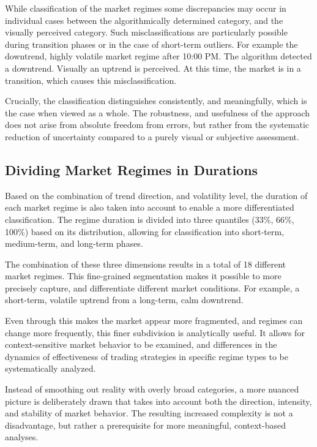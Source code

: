 While classification of the market regimes some discrepancies may occur in individual cases between the algorithmically determined category, and the visually perceived category. Such misclassifications are particularly possible during transition phases or in the case of short-term outliers. For example the downtrend, highly volatile market regime after 10:00 PM. The algorithm detected a downtrend. Visually an uptrend is perceived. At this time, the market is in a transition, which causes this misclassification.

Crucially, the classification distinguishes consistently, and meaningfully, which is the case when viewed as a whole. The robustness, and usefulness of the approach does not arise from absolute freedom from errors, but rather from the systematic reduction of uncertainty compared to a purely visual or subjective assessment.

\subsection{Dividing Market Regimes in Durations}

Based on the combination of trend direction, and volatility level, the duration of each market regime is also taken into account to enable a more differentiated classification. The regime duration is divided into three quantiles (33\%, 66\%, 100\%) based on its distribution, allowing for classification into short-term, medium-term, and long-term phases.

The combination of these three dimensions results in a total of 18 different market regimes. This fine-grained segmentation makes it possible to more precisely capture, and differentiate different market conditions. For example, a short-term, volatile uptrend from a long-term, calm downtrend.

Even through this makes the market appear more fragmented, and regimes can change more frequently, this finer subdivision is analytically useful. It allows for context-sensitive market behavior to be examined, and differences in the dynamics of effectiveness of trading strategies in specific regime types to be systematically analyzed.

Instead of smoothing out reality with overly broad categories, a more nuanced picture is deliberately drawn that takes into account both the direction, intensity, and stability of market behavior. The resulting increased complexity is not a disadvantage, but rather a prerequisite for more meaningful, context-based analyses.


